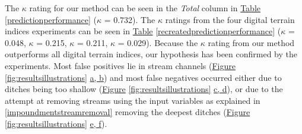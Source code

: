 \documentclass[]{interact}
\theoremstyle{plain}%
\theoremstyle{definition}
\theoremstyle{remark}
\begin{document}
\begin{table}[!htb]
    \label{predictionperformance}
\end{table}

The $\kappa$ rating for our method can be seen in the \textit{Total} column in \hyperref[predictionperformance]{Table} \ref{predictionperformance} ($\kappa$ = 0.732). The $\kappa$ ratings from the four digital terrain indices experiments can be seen in  \hyperref[recreatedpredictionperformance]{Table} \ref{recreatedpredictionperformance} ($\kappa$ = 0.048, $\kappa$ = 0.215, $\kappa$ = 0.211, $\kappa$ = 0.029). Because the $\kappa$ rating from our method outperforms all digital terrain indices, our hypothesis has been confirmed by the experiments. Most false positives lie in stream channels (\hyperref[fig:resultsillustrations]{Figure} \ref{fig:resultsillustrations} \hyperref[fig:resultsillustrations]{a, b}) and most false negatives occurred either due to ditches being too shallow (\hyperref[fig:resultsillustrations]{Figure} \ref{fig:resultsillustrations} \hyperref[fig:resultsillustrations]{c, d}), or due to the attempt at removing streams using the input variables as explained in \ref{impoundmentstreamremoval} removing the deepest ditches  (\hyperref[fig:resultsillustrations]{Figure} \ref{fig:resultsillustrations} \hyperref[fig:resultsillustrations]{e, f}).
\end{document}
